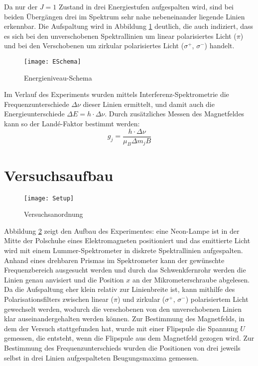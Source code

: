 \documentclass[a4paper,parskip,11pt, DIV12]{scrreprt}
\begin{document}
		Da nur der $J = 1$ Zustand in drei Energiestufen aufgespalten wird, sind bei beiden Übergängen drei im Spektrum sehr nahe nebeneinander liegende Linien erkennbar. Die Aufspaltung wird in Abbildung \ref{Abb:ESchema} deutlich, die auch indiziert, dass es sich bei den unverschobenen Spektrallinien um linear polarisiertes Licht ($\pi$) und bei den Verschobenen um zirkular polarisiertes Licht ($\sigma^+$, $\sigma^-$) handelt.
	\begin{figure}[H]
\centering
\texttt{[image: ESchema]}
\caption[ESchema]{Energieniveau-Schema}
\label{Abb:ESchema}
\end{figure}
	 Im Verlauf des Experiments wurden mittels Interferenz-Spektrometrie die Frequenzunterschiede $\Delta \nu$  dieser Linien ermittelt, und damit auch die Energieunterschiede $\Delta E = h \cdot \Delta \nu$. Durch zusätzliches Messen des Magnetfeldes kann so der Landé-Faktor bestimmt werden:
	\begin{equation}
	\label{Landé-Faktor}
	g_j = \frac{h \cdot \Delta \nu}{\mu_B \Delta m_j B}
	\end{equation}
	
	
	\section{Versuchsaufbau}
	\begin{figure}[H]
\centering
\texttt{[image: Setup]}
\caption[Setup]{Versuchsanordnung}
\label{Abb:Setup}
\end{figure}
	Abbildung \ref{Abb:Setup} zeigt den Aufbau des Experimentes: eine Neon-Lampe ist in der Mitte der Polschuhe eines Elektromagneten positioniert und das emittierte Licht wird mit einem Lummer-Spektrometer in diskrete Spektrallinien aufgespalten. Anhand eines drehbaren Prismas im Spektrometer kann der gewünschte Frequenzbereich ausgesucht werden und durch das Schwenkfernrohr werden die Linien genau anvisiert und die Position $x$ an der Mikrometerschraube abgelesen. Da die Aufspaltung eher klein relativ zur Linienbreite ist, kann mithilfe des Polarisationsfilters zwischen linear ($\pi$) und zirkular ($\sigma^+$, $\sigma^-$) polarisiertem Licht gewechselt werden, wodurch die verschobenen von den unverschobenen Linien klar auseinandergehalten werden können. Zur Bestimmung des Magnetfelds, in dem der Versuch stattgefunden hat, wurde mit einer Flipspule die Spannung $U$ gemessen, die entsteht, wenn die Flipspule aus dem Magnetfeld gezogen wird. Zur Bestimmung des Frequenzunterschieds wurden die Positionen von drei jeweils selbst in drei Linien aufgespalteten Beugungsmaxima gemessen.
	
\end{document}
